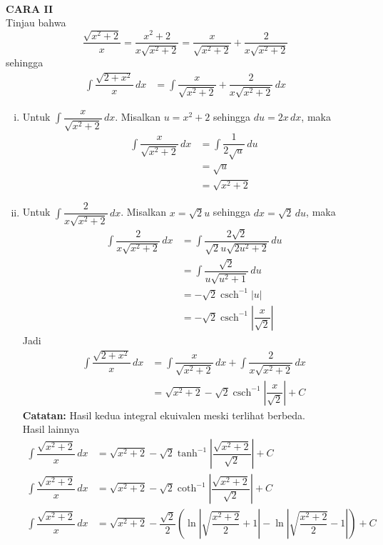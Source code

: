 \documentclass{article}
\DeclareMathOperator{\csch}{csch}
\begin{document}
\begin{enumerate}
\begin{align*}
\end{align*}
\textbf{CARA II}\\
Tinjau bahwa $$\dfrac{\sqrt{x^2+2}}{x}=\dfrac{x^2+2}{x\sqrt{x^2+2}}=\dfrac{x}{\sqrt{x^2+2}}+\dfrac{2}{x\sqrt{x^2+2}}$$
sehingga
\begin{align*}
\int \dfrac{\sqrt{2+x^2}}{x}\, dx &= \int \dfrac{x}{\sqrt{x^2+2}}+\dfrac{2}{x\sqrt{x^2+2}}\, dx
\end{align*}
\begin{enumerate}[(i)]
	\item Untuk $\displaystyle  \int \dfrac{x}{\sqrt{x^2+2}}\, dx$. Misalkan $u=x^2+2$ sehingga $du = 2x\, dx$, maka
	\begin{align*}
	\int \dfrac{x}{\sqrt{x^2+2}}\, dx &= \int \dfrac{1}{2\sqrt{u}}\, du\\
	&= \sqrt{u}\\
	&= \sqrt{x^2+2}
\end{align*}	 
	\item Untuk $\displaystyle \int \dfrac{2}{x\sqrt{x^2+2}}\, dx$. Misalkan $x=\sqrt{2}u$ sehingga $dx=\sqrt{2} \, du$, maka
	\begin{align*}
	\int \dfrac{2}{x\sqrt{x^2+2}}\, dx &= \int \dfrac{2\sqrt{2}}{\sqrt{2}u\sqrt{2u^2+2}}\, du\\
	&= \int \dfrac{\sqrt{2}}{u\sqrt{u^2+1}}\, du\\
	&= -\sqrt{2}\csch^{-1}|u| \\
	&= -\sqrt{2}\csch^{-1}\left|\dfrac{x}{\sqrt{2}}\right|
	\end{align*}
	Jadi 
	\begin{align*}
\int \dfrac{\sqrt{2+x^2}}{x}\, dx &= \int \dfrac{x}{\sqrt{x^2+2}}\, dx+\int \dfrac{2}{x\sqrt{x^2+2}}\, dx\\
&= \sqrt{x^2+2}-\sqrt{2}\csch^{-1}\left|\dfrac{x}{\sqrt{2}}\right| +C 
\end{align*}
\textbf{Catatan:} Hasil kedua integral ekuivalen meski terlihat berbeda. \\Hasil lainnya
\begin{align*}
\int \dfrac{\sqrt{x^2+2}}{x}\, dx &= \sqrt{x^2+2}-\sqrt{2}\tanh^{-1}\left|\dfrac{\sqrt{x^2+2}}{\sqrt{2}}\right|+C\\
\int \dfrac{\sqrt{x^2+2}}{x}\, dx &= \sqrt{x^2+2}-\sqrt{2}\coth^{-1}\left|\dfrac{\sqrt{x^2+2}}{\sqrt{2}}\right|+C\\
\int \dfrac{\sqrt{x^2+2}}{x}\, dx &= \sqrt{x^2+2}-\dfrac{\sqrt{2}}{2}\left(\ln\left|\sqrt{\dfrac{x^2+2}{2}}+1\right|-\ln\left|\sqrt{\dfrac{x^2+2}{2}}-1\right|\right) +C\\

\end{align*}
\end{enumerate}
\end{enumerate}
\end{document}
